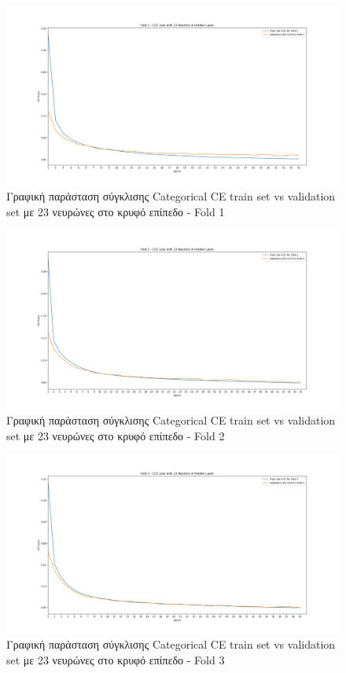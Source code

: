 \documentclass[12pt,a4paper]{article}
\begin{document}
\begin{figure}[H]
	\includegraphics[width=\textwidth]{19. Train vs Validation Fold 1.png}
	\caption{Γραφική παράσταση σύγκλισης Categorical CE train set vs validation set με 23 νευρώνες στο κρυφό επίπεδο - Fold 1}
\end{figure}

\begin{figure}[H]
	\includegraphics[width=\textwidth]{20. Train vs Validation Fold 2.png}
	\caption{Γραφική παράσταση σύγκλισης Categorical CE train set vs validation set με 23 νευρώνες στο κρυφό επίπεδο - Fold 2}
\end{figure}

\begin{figure}[H]
	\includegraphics[width=\textwidth]{21. Train vs Validation Fold 3.png}
	\caption{Γραφική παράσταση σύγκλισης Categorical CE train set vs validation set με 23 νευρώνες στο κρυφό επίπεδο - Fold 3}
\end{figure}
\end{document}
